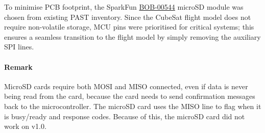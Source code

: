 To minimise PCB footprint, the SparkFun \href{https://core-electronics.com.au/breakout-board-for-microsd-transflash.html}{BOB-00544} microSD module was chosen from existing PAST inventory. Since the CubeSat flight model does not require non-volatile storage, MCU pins were prioritised for critical systems; this ensures a seamless transition to the flight model by simply removing the auxiliary SPI lines.

\paragraph{Remark}
MicroSD cards require both MOSI and MISO connected, even if data is never being read from the card, because the card needs to send confirmation messages back to the microcontroller. The microSD card uses the MISO line to flag when it is busy/ready and response codes. Because of this, the microSD card did not work on v1.0.